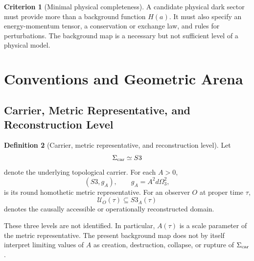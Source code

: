 \documentclass[11pt,a4paper]{article}
\def\Sthree{S3}%
\def\dd{d}%
\numberwithin{equation}{section}
\theoremstyle{definition}
\newtheorem{criterion}{Criterion}
\newtheorem{definition}[criterion]{Definition}
\theoremstyle{plain}
\theoremstyle{remark}
\newcommand{\Sthree}{S^3}
\newcommand{\Dom}{\mathcal{U}}
\newcommand{\dd}{\mathrm{d}}
\begin{document}
\begin{criterion}[Minimal physical completeness]
A candidate physical dark sector must provide more than a background function \(H(a)\). It must also specify an energy-momentum tensor, a conservation or exchange law, and rules for perturbations. The background map is a necessary but not sufficient level of a physical model.
\end{criterion}

\section{Conventions and Geometric Arena}
\subsection{Carrier, Metric Representative, and Reconstruction Level}
\begin{definition}[Carrier, metric representative, and reconstruction level]
Let
\begin{equation}
\Sigma_{\rm car}\simeq \Sthree
\end{equation}
denote the underlying topological carrier. For each \(A>0\),
\begin{equation}
(\Sthree,g_A),\qquad g_A=A^2\dd\Omega_3^2,
\end{equation}
is its round homothetic metric representative. For an observer \(O\) at proper time \(\tau\),
\begin{equation}
\Dom_O(\tau)\subseteq \Sthree_A(\tau)
\end{equation}
denotes the causally accessible or operationally reconstructed domain.
\end{definition}

These three levels are not identified. In particular, \(A(\tau)\) is a scale parameter of the metric representative. The present background map does not by itself interpret limiting values of \(A\) as creation, destruction, collapse, or rupture of \(\Sigma_{\rm car}\).
\end{document}
